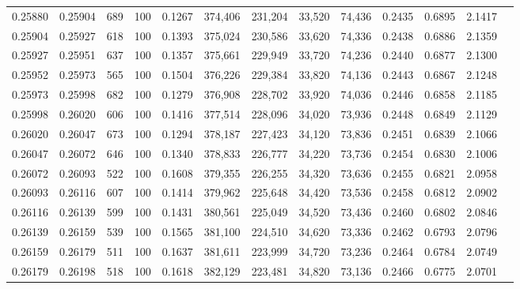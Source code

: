 \begin{tabular}{rrrrrrrrrrrrr}
0.25880 & 0.25904 &   689 & 100 &                                     0.1267 & 374,406 & 231,204 &  33,520 &  74,436 & 0.2435 & 0.6895 & 2.1417 \\
0.25904 & 0.25927 &   618 & 100 &                                     0.1393 & 375,024 & 230,586 &  33,620 &  74,336 & 0.2438 & 0.6886 & 2.1359 \\
0.25927 & 0.25951 &   637 & 100 &                                     0.1357 & 375,661 & 229,949 &  33,720 &  74,236 & 0.2440 & 0.6877 & 2.1300 \\
0.25952 & 0.25973 &   565 & 100 &                                     0.1504 & 376,226 & 229,384 &  33,820 &  74,136 & 0.2443 & 0.6867 & 2.1248 \\
0.25973 & 0.25998 &   682 & 100 &                                     0.1279 & 376,908 & 228,702 &  33,920 &  74,036 & 0.2446 & 0.6858 & 2.1185 \\
0.25998 & 0.26020 &   606 & 100 &                                     0.1416 & 377,514 & 228,096 &  34,020 &  73,936 & 0.2448 & 0.6849 & 2.1129 \\
0.26020 & 0.26047 &   673 & 100 &                                     0.1294 & 378,187 & 227,423 &  34,120 &  73,836 & 0.2451 & 0.6839 & 2.1066 \\
0.26047 & 0.26072 &   646 & 100 &                                     0.1340 & 378,833 & 226,777 &  34,220 &  73,736 & 0.2454 & 0.6830 & 2.1006 \\
0.26072 & 0.26093 &   522 & 100 &                                     0.1608 & 379,355 & 226,255 &  34,320 &  73,636 & 0.2455 & 0.6821 & 2.0958 \\
0.26093 & 0.26116 &   607 & 100 &                                     0.1414 & 379,962 & 225,648 &  34,420 &  73,536 & 0.2458 & 0.6812 & 2.0902 \\
0.26116 & 0.26139 &   599 & 100 &                                     0.1431 & 380,561 & 225,049 &  34,520 &  73,436 & 0.2460 & 0.6802 & 2.0846 \\
0.26139 & 0.26159 &   539 & 100 &                                     0.1565 & 381,100 & 224,510 &  34,620 &  73,336 & 0.2462 & 0.6793 & 2.0796 \\
0.26159 & 0.26179 &   511 & 100 &                                     0.1637 & 381,611 & 223,999 &  34,720 &  73,236 & 0.2464 & 0.6784 & 2.0749 \\
0.26179 & 0.26198 &   518 & 100 &                                     0.1618 & 382,129 & 223,481 &  34,820 &  73,136 & 0.2466 & 0.6775 & 2.0701 \\

\end{tabular}
